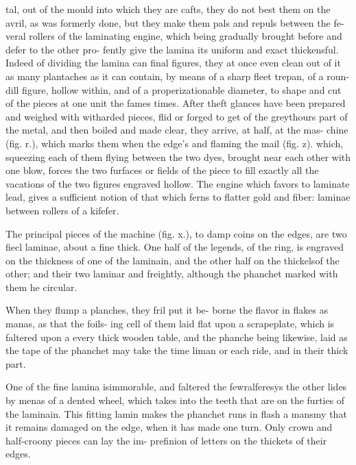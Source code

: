 \documentclass{article}
\begin{document}
tal, out of the mould into which they are cafts, they do not best them on the avril, as was formerly done, but they make them pals and repuls between the fe- veral rollers of the laminating engine, which being gradually brought before and defer to the other pro- fently give the lamina its uniform and exact thickensful. Indeed of dividing the lamina can final figures, they at once even clean out of it as many plantaches as it can contain, by means of a sharp fleet trepan, of a roun- dill figure, hollow within, and of a properizationable diameter, to shape and cut of the pieces at one unit the fames times. After theft glances have been prepared and weighed with witharded pieces, flid or forged to get of the greythours part of the metal, and then boiled and made clear, they arrive, at half, at the mas- chine (fig. r.), which marks them when the edge's and flaming the mail (fig. z). which, squeezing each of them flying between the two dyes, brought near each other with one blow, forces the two furfaces or fields of the piece to fill exactly all the vacations of the two figures engraved hollow. The engine which favors to laminate lead, gives a sufficient notion of that which ferns to flatter gold and fiber: laminae between rollers of a kifefer.

The principal pieces of the machine (fig. x.), to damp coins on the edges, are two fiecl laminae, about a fine thick. One half of the legends, of the ring, is engraved on the thickness of one of the laminain, and the other half on the thickelsof the other; and their two laminar and freightly, although the phanchet marked with them he circular.

When they flump a planches, they fril put it be- borne the flavor in flakes as manas, as that the foils- ing cell of them laid flat upon a scrapeplate, which is faltered upon a every thick wooden table, and the phanche being likewise, laid as the tape of the phanchet may take the time liman or each ride, and in their thick part.

One of the fine lamina isimmorable, and faltered the fewralferesys the other lides by menas of a dented wheel, which takes into the teeth that are on the furties of the laminain. This fitting lamin makes the phanchet runs in flash a mansmy that it remains damaged on the edge, when it has made one turn. Only crown and half-croony pieces can lay the im- prefinion of letters on the thickets of their edges.
\end{document}
